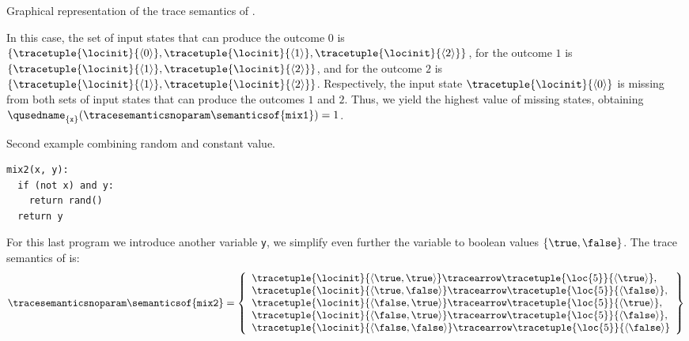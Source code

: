 \begin{example}
\begin{marginfigure}[*-2]
  \caption{Graphical representation of the trace semantics of .}
  \end{marginfigure}
  In this case, the set of input states that can produce the outcome $0$ is $\{\tracetuple{\locinit}{\langle 0\rangle}, \tracetuple{\locinit}{\langle 1\rangle}, \tracetuple{\locinit}{\langle 2\rangle}\}$, for the outcome $1$ is $\{\tracetuple{\locinit}{\langle 1\rangle}, \tracetuple{\locinit}{\langle 2\rangle}\}$, and for the outcome $2$ is $\{\tracetuple{\locinit}{\langle 1\rangle}, \tracetuple{\locinit}{\langle 2\rangle}\}$.
  Respectively, the input state $\tracetuple{\locinit}{\langle 0 \rangle}$ is missing from both sets of input states that can produce the outcomes $1$ and $2$.
  Thus, we yield the highest value of missing states, obtaining $\qusedname_{\{\texttt{x}\}}(\tracesemanticsnoparam\semanticsof{\texttt{mix1}})=1$.


  \begin{marginlisting}
    \caption{Second example combining random and constant value.}
    \vspace{25pt}
  \begin{lstlisting}[style=mystyle,language=customPython]
mix2(x, y):
  if (not x) and y:
    return rand()
  return y
 \end{lstlisting}
  \end{marginlisting}
  For this last program we introduce another variable \texttt{y}, we simplify even further the variable to boolean values $\{\true, \false\}$.
  The trace semantics of  is:
  \begin{align*}
    \tracesemanticsnoparam\semanticsof{\texttt{mix2}}
    =
    \left\{
      \begin{array}{l}
        \tracetuple{\locinit}{\langle \true, \true\rangle}\tracearrow\tracetuple{\loc{5}}{\langle \true\rangle}, \\
        \tracetuple{\locinit}{\langle \true, \false\rangle}\tracearrow\tracetuple{\loc{5}}{\langle \false\rangle}, \\
        \tracetuple{\locinit}{\langle \false, \true\rangle}\tracearrow\tracetuple{\loc{5}}{\langle \true\rangle}, \\
        \tracetuple{\locinit}{\langle \false, \true\rangle}\tracearrow\tracetuple{\loc{5}}{\langle \false\rangle}, \\
        \tracetuple{\locinit}{\langle \false, \false\rangle}\tracearrow\tracetuple{\loc{5}}{\langle \false\rangle}
      \end{array}
      \right\}
  \end{align*}
  \begin{marginfigure}
\end{marginfigure}
\end{example}
